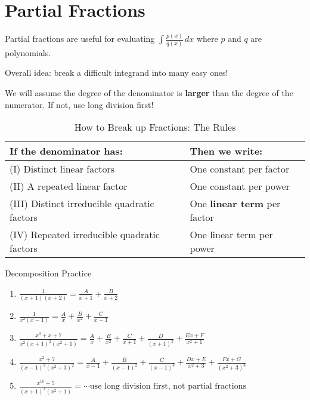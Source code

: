 \section{Partial Fractions}
Partial fractions are useful for evaluating $ \displaystyle \int \frac{p(x)}{q(x)} \, d{x} $
where $ p $ and $ q $ are polynomials.

Overall idea: break a difficult integrand into many easy ones!
\begin{Remark}{}{}
    We will assume the degree of the denominator is \textbf{larger} than the
    degree of the numerator. If not, use long division first!
\end{Remark}

\begin{table}[!htbp]
    \caption{How to Break up Fractions: The Rules}
    \begin{tabularx}{\linewidth}{@{}YY@{}}
        \toprule
        If the denominator has:                      & Then we write:                      \\
        \midrule
        (I) Distinct linear factors                  & One constant per factor             \\
        (II) A repeated linear factor                & One constant per power              \\
        (III) Distinct irreducible quadratic factors & One \textbf{linear term} per factor \\
        (IV) Repeated irreducible quadratic factors  & One linear term per power
    \end{tabularx}
\end{table}

\begin{Example}{Decomposition Practice}{}
    \begin{enumerate}[label=(\roman*)]
        \item $ \displaystyle \frac{1}{(x+1)(x+2)}=\frac{A}{x+1}+\frac{B}{x+2} $
        \item $ \displaystyle \frac{1}{x^2(x-1)}=\frac{A}{x} +\frac{B}{x^2}+\frac{C}{x-1} $
        \item $ \displaystyle \frac{x^3+x+7}{x^2(x+1)^2(x^2+1)}=\frac{A}{x} +\frac{B}{x^2}+\frac{C}{x+1}
                  +\frac{D}{(x+1)^2}+\frac{Ex+F}{x^2+1} $
        \item $ \displaystyle \frac{x^2+7}{(x-1)^3(x^2+3)^2}
                  =\frac{A}{x-1} +\frac{B}{(x-1)^2}+\frac{C}{(x-1)^3}+\frac{Dx+E}{x^2+3}
                  +\frac{Fx+G}{(x^2+3)^3} $
        \item $ \displaystyle \frac{x^{10}+5}{(x+1)^3(x^2+1)}=\cdots\text{use long division first, not partial
                      fractions} $
    \end{enumerate}
\end{Example}

